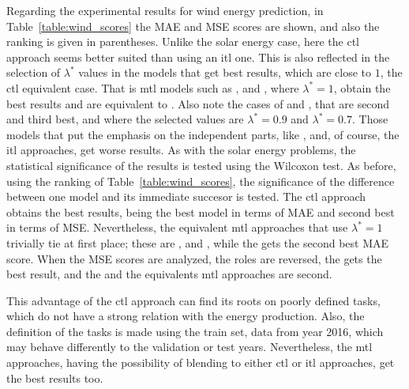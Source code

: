 Regarding the experimental results for wind energy prediction, in Table~\ref{table:wind_scores} the MAE and MSE scores are shown, and also the ranking is given in parentheses. 
Unlike the solar energy case, here the \acrshort{ctl} approach seems better suited than using an \acrshort{itl} one. This is also reflected in the selection of $\lambda^*$ values in the models that get best results, which are close to $1$, the \acrshort{ctl} equivalent case. That is \acrshort{mtl} models such as ,  and , where $\lambda^*=1$, obtain the best results and are equivalent to . Also note the cases of  and , that are second and third best, and where the selected values are $\lambda^*=0.9$ and $\lambda^*=0.7$.
Those models that put the emphasis on the independent parts, like , and, of course, the \acrshort{itl} approaches, get worse results.
%
%
As with the solar energy problems, the statistical significance of the results is tested using the Wilcoxon test. As before, using the ranking of Table~\ref{table:wind_scores}, the significance of the difference between one model and its immediate succesor is tested. 
%
%
The \acrshort{ctl} approach obtains the best results, being the best model in terms of MAE and second best in terms of MSE. Nevertheless, the equivalent \acrshort{mtl} approaches that use $\lambda^*=1$ trivially tie at first place; these are ,  and , while the  gets the second best MAE score.
When the MSE scores are analyzed, the roles are reversed, the  gets the best result, and the  and the equivalents \acrshort{mtl} approaches are second.

%
This advantage of the \acrshort{ctl} approach can find its roots on poorly defined tasks, which do not have a strong relation with the energy production. Also, the definition of the tasks is made using the train set, data from year 2016, which may behave differently to the validation or test years.
Nevertheless, the \acrshort{mtl} approaches, having the possibility of blending to either \acrshort{ctl} or \acrshort{itl} approaches, get the best results too.

